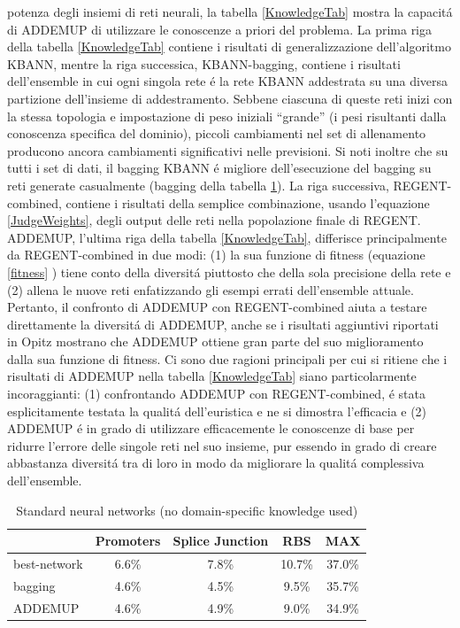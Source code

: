 \documentclass[a4paper,10pt]{article}
\begin{document}
potenza degli insiemi di reti neurali, la tabella \ref{KnowledgeTab} mostra la capacit\'a di ADDEMUP di utilizzare le conoscenze a priori del problema. La prima riga della tabella \ref{KnowledgeTab} contiene i risultati di generalizzazione dell'algoritmo KBANN, mentre la riga successica, KBANN-bagging, contiene i risultati dell'ensemble in cui ogni singola rete \'e la rete KBANN addestrata su una diversa partizione dell'insieme di addestramento. Sebbene ciascuna di queste reti inizi con la stessa topologia e impostazione di peso iniziali ``grande'' (i pesi risultanti dalla conoscenza specifica del dominio), piccoli cambiamenti nel set di allenamento producono ancora cambiamenti significativi nelle previsioni. Si noti inoltre che su tutti i set di dati, il bagging KBANN \'e migliore dell'esecuzione del bagging su reti generate casualmente (bagging della tabella \ref{NoKnowledgeTab}). La riga successiva, REGENT-combined, contiene i risultati della semplice combinazione, usando l'equazione \ref{JudgeWeights}, degli output delle reti nella popolazione finale di REGENT. ADDEMUP, l'ultima riga della tabella \ref{KnowledgeTab}, differisce principalmente da REGENT-combined in due modi: (1) la sua funzione di fitness (equazione \ref{fitness} ) tiene conto della diversit\'a piuttosto che della sola precisione della rete e (2) allena le nuove reti enfatizzando gli esempi errati dell'ensemble attuale. Pertanto, il confronto di ADDEMUP con REGENT-combined aiuta a testare direttamente la diversit\'a di ADDEMUP, anche se i risultati aggiuntivi riportati in Opitz \cite{opitz1995anytime} mostrano che ADDEMUP ottiene gran parte del suo miglioramento dalla sua funzione di fitness. Ci sono due ragioni principali per cui si ritiene che i risultati di ADDEMUP nella tabella \ref{KnowledgeTab} siano particolarmente incoraggianti: (1) confrontando ADDEMUP con REGENT-combined, \'e stata esplicitamente testata la qualit\'a dell'euristica e ne si dimostra l'efficacia e (2) ADDEMUP \'e in grado di utilizzare efficacemente le conoscenze di base per ridurre l'errore delle singole reti nel suo insieme, pur essendo in grado di creare abbastanza diversit\'a tra di loro in modo da migliorare la qualit\'a complessiva dell'ensemble. 
  
  \begin{table}[h]\caption{Standard neural networks (no domain-specific knowledge used)} \label{NoKnowledgeTab}
   \centering
   \begin{tabular}[h]{|l|c|c|c|c|}
    \hline
    & Promoters & Splice Junction & RBS & MAX \\ \hline
   best-network & 6.6\% & 7.8\% & 10.7\% & 37.0\% \\ 
   bagging & 4.6\% & 4.5\% & 9.5\% & 35.7\% \\
   ADDEMUP & 4.6\% & 4.9\% & 9.0\% & 34.9\% \\ \hline
   \end{tabular}
  \end{table}
  
\end{document}
